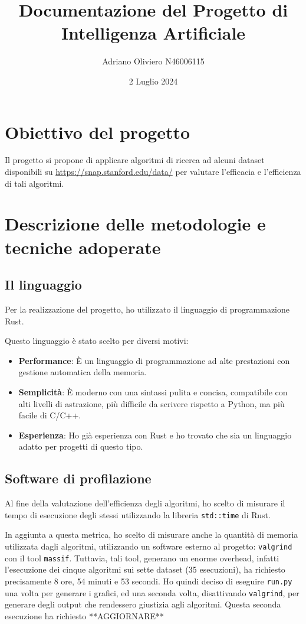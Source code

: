\documentclass{article}
\title{Documentazione del Progetto di Intelligenza Artificiale}
\author{Adriano Oliviero N46006115}
\date{2 Luglio 2024}
\begin{document}
\maketitle

\newpage
\tableofcontents
\newpage
\section{Obiettivo del progetto}
Il progetto si propone di applicare algoritmi di ricerca ad alcuni dataset disponibili su
\url{https://snap.stanford.edu/data/} per valutare l'efficacia e l'efficienza di tali algoritmi.

\section{Descrizione delle metodologie e tecniche adoperate}
\subsection{Il linguaggio}
Per la realizzazione del progetto, ho utilizzato il linguaggio di programmazione Rust.

Questo linguaggio è stato scelto per diversi motivi:
\begin{itemize}
	\item \textbf{Performance}: È un linguaggio di programmazione ad alte prestazioni con gestione automatica della memoria.
	\item \textbf{Semplicità}: È moderno con una sintassi pulita e concisa, compatibile con alti livelli di astrazione, più difficile da scrivere rispetto a Python, ma più facile di C/C++.
	\item \textbf{Esperienza}: Ho già esperienza con Rust e ho trovato che sia un linguaggio adatto per progetti di questo tipo.
\end{itemize}

\subsection{Software di profilazione}
Al fine della valutazione dell'efficienza degli algoritmi, ho scelto di misurare il tempo di esecuzione degli stessi
utilizzando la libreria \texttt{std::time} di Rust.

In aggiunta a questa metrica, ho scelto di misurare anche la quantità
di memoria utilizzata dagli algoritmi, utilizzando un software esterno al progetto: \texttt{valgrind} con il tool \texttt{massif}.
Tuttavia, tali tool, generano un enorme overhead, infatti l'esecuzione dei cinque algoritmi sui sette dataset (35 esecuzioni),
ha richiesto precisamente 8 ore, 54 minuti e 53 secondi.
Ho quindi deciso di eseguire \texttt{run.py} una volta per generare i grafici, ed una seconda volta, disattivando \texttt{valgrind},
per generare degli output che rendessero giustizia agli algoritmi.
Questa seconda esecuzione ha richiesto **AGGIORNARE**
\end{document}

